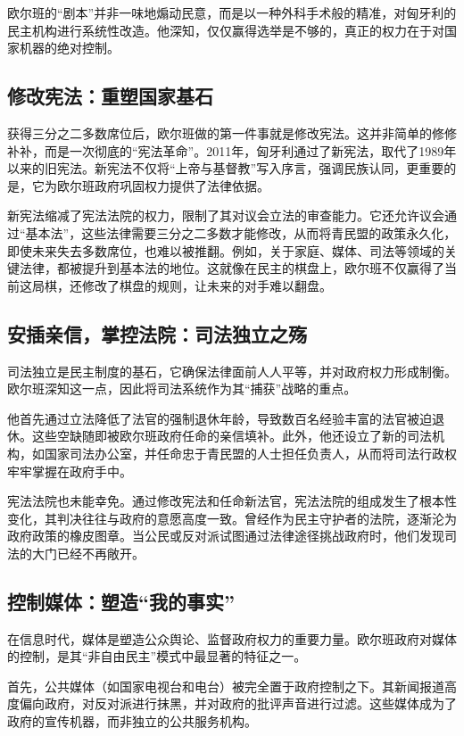 欧尔班的“剧本”并非一味地煽动民意，而是以一种外科手术般的精准，对匈牙利的民主机构进行系统性改造。他深知，仅仅赢得选举是不够的，真正的权力在于对国家机器的绝对控制。

\subsection{修改宪法：重塑国家基石}

获得三分之二多数席位后，欧尔班做的第一件事就是修改宪法。这并非简单的修修补补，而是一次彻底的“宪法革命”。2011年，匈牙利通过了新宪法，取代了1989年以来的旧宪法。新宪法不仅将“上帝与基督教”写入序言，强调民族认同，更重要的是，它为欧尔班政府巩固权力提供了法律依据。

新宪法缩减了宪法法院的权力，限制了其对议会立法的审查能力。它还允许议会通过“基本法”，这些法律需要三分之二多数才能修改，从而将青民盟的政策永久化，即使未来失去多数席位，也难以被推翻。例如，关于家庭、媒体、司法等领域的关键法律，都被提升到基本法的地位。这就像在民主的棋盘上，欧尔班不仅赢得了当前这局棋，还修改了棋盘的规则，让未来的对手难以翻盘。

\subsection{安插亲信，掌控法院：司法独立之殇}

司法独立是民主制度的基石，它确保法律面前人人平等，并对政府权力形成制衡。欧尔班深知这一点，因此将司法系统作为其“捕获”战略的重点。

他首先通过立法降低了法官的强制退休年龄，导致数百名经验丰富的法官被迫退休。这些空缺随即被欧尔班政府任命的亲信填补。此外，他还设立了新的司法机构，如国家司法办公室，并任命忠于青民盟的人士担任负责人，从而将司法行政权牢牢掌握在政府手中。

宪法法院也未能幸免。通过修改宪法和任命新法官，宪法法院的组成发生了根本性变化，其判决往往与政府的意愿高度一致。曾经作为民主守护者的法院，逐渐沦为政府政策的橡皮图章。当公民或反对派试图通过法律途径挑战政府时，他们发现司法的大门已经不再敞开。

\subsection{控制媒体：塑造“我的事实”}

在信息时代，媒体是塑造公众舆论、监督政府权力的重要力量。欧尔班政府对媒体的控制，是其“非自由民主”模式中最显著的特征之一。

首先，公共媒体（如国家电视台和电台）被完全置于政府控制之下。其新闻报道高度偏向政府，对反对派进行抹黑，并对政府的批评声音进行过滤。这些媒体成为了政府的宣传机器，而非独立的公共服务机构。

